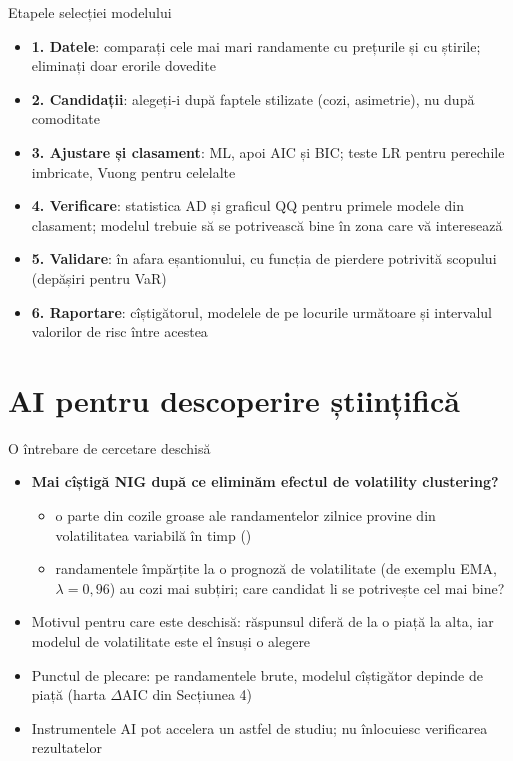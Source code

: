 \begin{frame}{Etapele selecției modelului}
\itemsize{\small}
\begin{itemize}
    \item \textbf{1. Datele}: comparați cele mai mari randamente cu prețurile și cu știrile; eliminați doar erorile dovedite
    \item \textbf{2. Candidații}: alegeți-i după faptele stilizate (cozi, asimetrie), nu după comoditate
    \item \textbf{3. Ajustare și clasament}: ML, apoi AIC și BIC; teste LR pentru perechile imbricate, Vuong pentru celelalte
    \item \textbf{4. Verificare}: statistica AD și graficul QQ pentru primele modele din clasament; modelul trebuie să se potrivească bine în zona care vă interesează
    \item \textbf{5. Validare}: în afara eșantionului, cu funcția de pierdere potrivită scopului (depășiri pentru VaR)
    \item \textbf{6. Raportare}: cîștigătorul, modelele de pe locurile următoare și intervalul valorilor de risc între acestea
\end{itemize}
\end{frame}


\section{AI pentru descoperire științifică}

\begin{frame}{O întrebare de cercetare deschisă}
\itemsize{\small}
\begin{itemize}
    \item \textbf{Mai cîștigă NIG după ce eliminăm efectul de volatility clustering?}
    \begin{itemize}
        \item o parte din cozile groase ale randamentelor zilnice provine din volatilitatea variabilă în timp ()
        \item randamentele împărțite la o prognoză de volatilitate (de exemplu EMA, $\lambda = 0{,}96$) au cozi mai subțiri; care candidat li se potrivește cel mai bine?
    \end{itemize}
    \item Motivul pentru care este deschisă: răspunsul diferă de la o piață la alta, iar modelul de volatilitate este el însuși o alegere
    \item Punctul de plecare: pe randamentele brute, modelul cîștigător depinde de piață (harta $\Delta$AIC din Secțiunea 4)
    \item Instrumentele AI pot accelera un astfel de studiu; nu înlocuiesc verificarea rezultatelor 
\end{itemize}
\end{frame}

